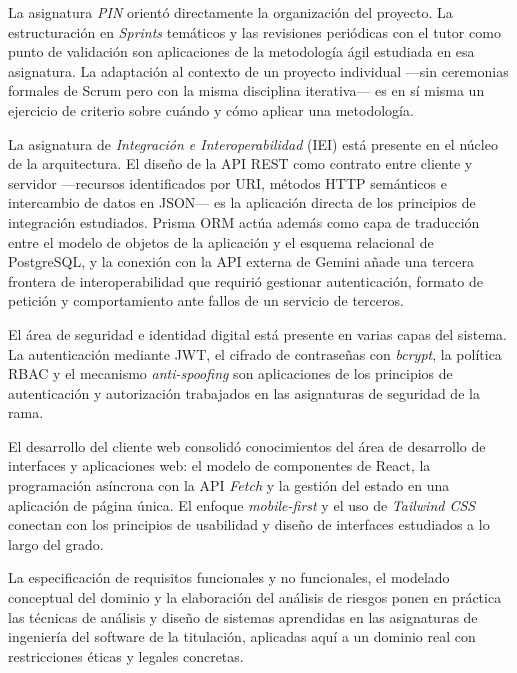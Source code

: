 \documentclass[11pt,oneside,spanish,listoffigures,listoftables]{tfgetsinf}
\begin{document}
La asignatura \textit{PIN} orientó directamente la organización del proyecto. La estructuración en \textit{Sprints} temáticos y las revisiones periódicas con el tutor como punto de validación son aplicaciones de la metodología ágil estudiada en esa asignatura. La adaptación al contexto de un proyecto individual —sin ceremonias formales de Scrum pero con la misma disciplina iterativa— es en sí misma un ejercicio de criterio sobre cuándo y cómo aplicar una metodología.

La asignatura de \textit{Integración e Interoperabilidad} (IEI) está presente en el núcleo de la arquitectura. El diseño de la API REST como contrato entre cliente y servidor —recursos identificados por URI, métodos HTTP semánticos e intercambio de datos en JSON— es la aplicación directa de los principios de integración estudiados. Prisma ORM actúa además como capa de traducción entre el modelo de objetos de la aplicación y el esquema relacional de PostgreSQL, y la conexión con la API externa de Gemini añade una tercera frontera de interoperabilidad que requirió gestionar autenticación, formato de petición y comportamiento ante fallos de un servicio de terceros.

El área de seguridad e identidad digital está presente en varias capas del sistema. La autenticación mediante JWT, el cifrado de contraseñas con \textit{bcrypt}, la política RBAC y el mecanismo \textit{anti-spoofing} son aplicaciones de los principios de autenticación y autorización trabajados en las asignaturas de seguridad de la rama.

El desarrollo del cliente web consolidó conocimientos del área de desarrollo de interfaces y aplicaciones web: el modelo de componentes de React, la programación asíncrona con la API \textit{Fetch} y la gestión del estado en una aplicación de página única. El enfoque \textit{mobile-first} y el uso de \textit{Tailwind CSS} conectan con los principios de usabilidad y diseño de interfaces estudiados a lo largo del grado.

La especificación de requisitos funcionales y no funcionales, el modelado conceptual del dominio y la elaboración del análisis de riesgos ponen en práctica las técnicas de análisis y diseño de sistemas aprendidas en las asignaturas de ingeniería del software de la titulación, aplicadas aquí a un dominio real con restricciones éticas y legales concretas.
\end{document}
